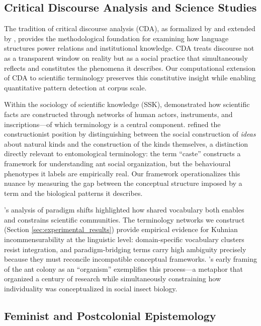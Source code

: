 \documentclass[
]{article}
\numberwithin{equation}{section}
\begin{document}
\subsection{Critical Discourse Analysis and Science
Studies}\label{critical-discourse-analysis-and-science-studies}

The tradition of critical discourse analysis (CDA), as formalized by
\citet{fairclough1992} and extended by \citet{wodak2009methods},
provides the methodological foundation for examining how language
structures power relations and institutional knowledge. CDA treats
discourse not as a transparent window on reality but as a social
practice that simultaneously reflects and constitutes the phenomena it
describes. Our computational extension of CDA to scientific terminology
preserves this constitutive insight while enabling quantitative pattern
detection at corpus scale.

Within the sociology of scientific knowledge (SSK), \citet{latour1987}
demonstrated how scientific facts are constructed through networks of
human actors, instruments, and inscriptions---of which terminology is a
central component. \citet{hacking1999social} refined the constructionist
position by distinguishing between the social construction of
\emph{ideas} about natural kinds and the construction of the kinds
themselves, a distinction directly relevant to entomological
terminology: the term ``caste'' constructs a framework for understanding
ant social organization, but the behavioural phenotypes it labels are
empirically real. Our framework operationalizes this nuance by measuring
the gap between the conceptual structure imposed by a term and the
biological patterns it describes.

\citeauthor{kuhn1996}'s \citeyearpar{kuhn1996} analysis of paradigm
shifts highlighted how shared vocabulary both enables and constrains
scientific communities. The terminology networks we construct (Section
\ref{sec:experimental_results}) provide empirical evidence for Kuhnian
incommensurability at the linguistic level: domain-specific vocabulary
clusters resist integration, and paradigm-bridging terms carry high
ambiguity precisely because they must reconcile incompatible conceptual
frameworks. \citeauthor{wheeler1911}'s \citeyearpar{wheeler1911} early
framing of the ant colony as an ``organism'' exemplifies this
process---a metaphor that organized a century of research while
simultaneously constraining how individuality was conceptualized in
social insect biology.

\subsection{Feminist and Postcolonial
Epistemology}\label{feminist-and-postcolonial-epistemology}
\end{document}
